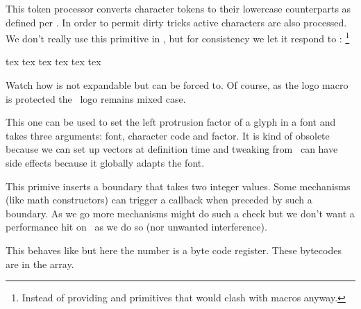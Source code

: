 \stopoldprimitive

\startoldprimitive[title={\prm {lowercase}}]

This token processor converts character tokens to their lowercase counterparts as
defined per . In order to permit dirty tricks active characters are
also processed. We don't really use this primitive in \CONTEXT, but for
consistency we let it respond to : \footnote {Instead of providing
\type {\lowercased} and \type {\uppercased} primitives that would clash with
macros anyway.}

\startbuffer
\edef           \foo       {\lowercase{tex TeX \TEX}} \meaningless\foo
\lowercase{\edef\foo                  {tex TeX \TEX}} \meaningless\foo
\edef           \foo{\expand\lowercase{tex TeX \TEX}} \meaningless\foo
\stopbuffer

\typebuffer

Watch how  is not expandable but can be forced to. Of course, as
the logo macro is protected the \TEX\ logo remains mixed case.

\startlines
\getbuffer
\stoplines

\stopoldprimitive

\startnewprimitive[title={\prm {lpcode}}]

This one can be used to set the left protrusion factor of a glyph in a font and
takes three arguments: font, character code and factor. It is kind of obsolete
because we can set up vectors at definition time and tweaking from \TEX\ can have
side effects because it globally adapts the font.

\stopnewprimitive

\startnewprimitive[title={\prm {luaboundary}}]

This primive inserts a boundary that takes two integer values. Some mechanisms
(like math constructors) can trigger a callback when preceded by such a boundary.
As we go more mechanisms might do such a check but we don't want a performance
hit on \CONTEXT\ as we do so (nor unwanted interference).

\stopnewprimitive

\startnewprimitive[title={\prm {luabytecode}}]

This behaves like  but here the number is a byte code register.
These bytecodes are in the  array.

\stopnewprimitive

\startnewprimitive[title={\prm {luabytecodecall}}]

